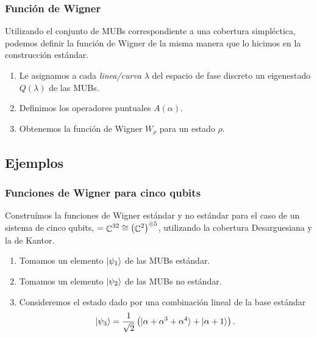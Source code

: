 \documentclass[10pt, spanish]{beamer}
\DeclareMathOperator{\C}{\mathbb{C}}
\let\H\relax
\DeclareMathOperator{\H}{\mathcal H}
\begin{document}
  \begin{frame}
    \frametitle{Función de Wigner}

    Utilizando el conjunto de MUBs correspondiente a una
    cobertura simpléctica, podemos definir la función de
    Wigner de la misma manera que lo hicimos en la
    construcción estándar.

    \vspace{15pt}

    \begin{enumerate}
      \item Le asignamos a cada \textit{linea/curva}
        $\lambda$ del espacio de fase discreto un
        eigenestado $Q(\lambda)$ de las MUBs.
      \item Definimos los operadores puntuales $A(\alpha)$.
      \item Obtenemos la función de Wigner $W_\rho$ para un
        estado  $\rho$.
    \end{enumerate}
  \end{frame}

  \subsection{Ejemplos}

  \begin{frame}
    \frametitle{Funciones de Wigner para cinco qubits}

    Construímos la funciones de Wigner estándar y no
    estándar para el caso de un sistema de cinco qubits, $\H
    = \C^{32} \cong \left( \C^2 \right)^{\otimes 5}$,
    utilizando la cobertura Desarguesiana y la de Kantor.

    \vspace{5pt}

    \begin{enumerate}
      \item Tomamos un elemento $\ket{\psi_1}$ de las MUBs
        estándar.
      \item Tomamos un elemento $\ket{\psi_2}$ de las MUBs
        no estándar.
      \item Consideremos el estado dado por una combinación
        lineal de la base estándar
        \[
          \ket{\psi_3}
          = \frac{1}{\sqrt{2}} 
          \left( \ket{\alpha + \alpha^3 + \alpha^{4}} +
          \ket{\alpha+1} \right). 
        \]
    \end{enumerate}
  \end{frame}
\end{document}

